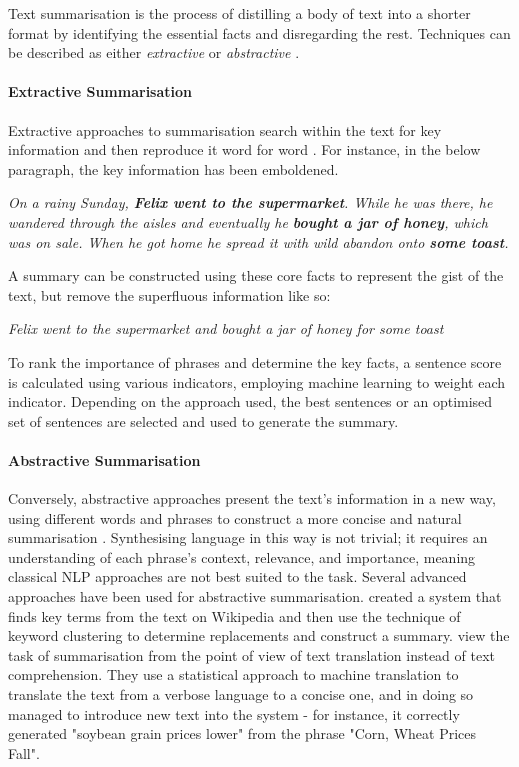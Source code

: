 Text summarisation is the process of distilling a body of text into a shorter format by identifying the essential facts and disregarding the rest. Techniques can be described as either \textit{extractive} or \textit{abstractive}  \cite{maybury1999} \cite{tan2017}.

\paragraph{Extractive Summarisation}
Extractive approaches to summarisation search within the text for key information and then reproduce it word for word \cite{tan2017}. For instance, in the below paragraph, the key information has been emboldened.

\textit{On a rainy Sunday, \textbf{Felix went to the supermarket}. While he was there, he wandered through the aisles and eventually he \textbf{bought a jar of honey}, which was on sale. When he got home he spread it with wild abandon onto \textbf{some toast}.}

A summary can be constructed using these core facts to represent the gist of the text, but remove the superfluous information like so:

\textit{Felix went to the supermarket and bought a jar of honey for some toast}

To rank the importance of phrases and determine the key facts, a sentence score is calculated using various indicators, employing machine learning to weight each indicator. Depending on the approach used, the best sentences or an optimised set of sentences are selected and used to generate the summary.

\paragraph{Abstractive Summarisation}
Conversely, abstractive approaches present the text's information in a new way, using different words and phrases to construct a more concise and natural summarisation \cite{allahyari2017}. Synthesising language in this way is not trivial; it requires an understanding of each phrase's context, relevance, and importance, meaning classical NLP approaches are not best suited to the task. Several advanced approaches have been used for abstractive summarisation. \citeauthor{xu2010} created a system that finds key terms from the text on Wikipedia and then use the technique of keyword clustering to determine replacements and construct a summary. \citeauthor{banko2000} view the task of summarisation from the point of view of text translation instead of text comprehension. They use a statistical approach to machine translation to translate the text from a verbose language to a concise one, and in doing so managed to introduce new text into the system - for instance, it correctly generated "soybean grain prices lower" from the phrase "Corn, Wheat Prices Fall".

